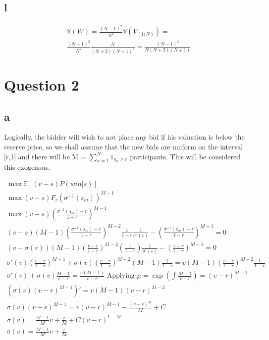 \documentclass[10pt]{paper}
\begin{document}
\subsection*{l}

\begin{align*}
  \mathbb{V}(W) = \frac{(N-1)^2}{N^2} \mathbb{V}(V_{(1:N)}) = \\
  \frac{(N-1)^2}{N^2} \frac{N}{(N+2)(N+1)^2} = \frac{(N-1)^2}{N(N+2)(N+1)}
\end{align*}


\section*{Question 2}

\subsection*{a}

Logically, the bidder will wish to not place any bid if his valuation is below
the reserve price, so we shall assume that the new bids are uniform on the interval
[r,1] and there will be M = $\sum_{n=1}^N 1_{v_n \geq r}$ participants. This  will be
considered this exogenous.

\begin{align*}
  \max \mathbb{E}[ (v-s)P( win | s ) ] \\
  \max (v-s)F_v(\sigma^{-1}(s_m))^{M-1}\\
  \max (v-s) (\frac{\sigma^{-1}(s_m) -r }{1-r})^{M-1}\\
  (v-s)(M-1)(\frac{\sigma^{-1}(s_m) - r}{1-r})^{M-2} \frac{1}{1-r} \frac{1}{\sigma'(v)} - (\frac{\sigma^{-1}(s_m) -r}{1-r})^{M-1} = 0\\
  (v-\sigma(v))(M-1)(\frac{v - r}{1-r})^{M-2} (\frac{1}{1-r}) \frac{1}{\sigma'(v)} - (\frac{v -r}{1-r})^{M-1} = 0\\
  \sigma'(v) (\frac{v-r}{1-r})^{M-1} + \sigma(v) (\frac{v-r}{1-r})^{M-2} (M-1) \frac{1}{1-r} = v(M-1)(\frac{v-r}{1-r})^{M-2} \frac{1}{1-r}\\
  \sigma'(v) + \sigma(v) \frac{M-1}{v-r} = \frac{v(M-1)}{v-r} \text{ Applying } \mu = \exp( \int \frac{M-1}{v-r}) = (v-r)^{M-1}\\
  (\sigma(v)(v-r)^{M-1})' = v(M-1)(v-r)^{M-2}\\
  \sigma(v)(v-r)^{M-1} = v(v-r)^{M-1} - \frac{(v-r)^M}{M} + C\\
  \sigma(v) = \frac{M-1}{M}v + \frac{r}{M} + C(v-r)^{1-M}\\
  \sigma(v) = \frac{M-1}{M}v + \frac{r}{M}\\
\end{align*}
\end{document}
